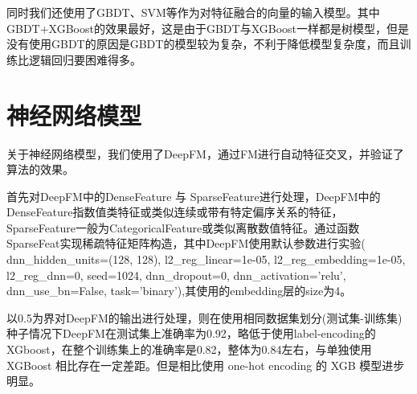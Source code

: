 同时我们还使用了GBDT、SVM等作为对特征融合的向量的输入模型。其中GBDT+XGBoost的效果最好，这是由于GBDT与XGBoost一样都是树模型，但是没有使用GBDT的原因是GBDT的模型较为复杂，不利于降低模型复杂度，而且训练比逻辑回归要困难得多。



\section{神经网络模型}


关于神经网络模型，我们使用了DeepFM，通过FM进行自动特征交叉，并验证了算法的效果。

首先对DeepFM中的DenseFeature 与 SparseFeature进行处理，DeepFM中的DenseFeature指数值类特征或类似连续或带有特定偏序关系的特征，SparseFeature一般为CategoricalFeature或类似离散数值特征。通过函数SparseFeat实现稀疏特征矩阵构造，其中DeepFM使用默认参数进行实验(
dnn\_hidden\_units=(128, 128), l2\_reg\_linear=1e-05, l2\_reg\_embedding=1e-05, l2\_reg\_dnn=0, seed=1024, dnn\_dropout=0, dnn\_activation='relu', dnn\_use\_bn=False, task='binary'),其使用的embedding层的size为4。

以0.5为界对DeepFM的输出进行处理，则在使用相同数据集划分(测试集-训练集)种子情况下DeepFM在测试集上准确率为0.92，略低于使用label-encoding的 XGboost，在整个训练集上的准确率是0.82，整体为0.84左右，与单独使用 XGBoost 相比存在一定差距。但是相比使用 one-hot encoding 的 XGB 模型进步明显。




